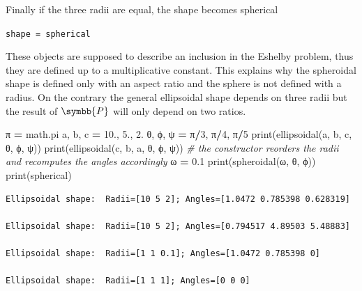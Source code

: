 \documentclass[
  a4paper,
  numbers=noendperiod,
  DIV=12]{scrreprt}
\newenvironment{Shaded}{\begin{snugshade}}{\end{snugshade}}
\newcommand{\BuiltInTok}[1]{#1}
\newcommand{\CommentTok}[1]{\textcolor[rgb]{0.56,0.35,0.01}{\textit{#1}}}
\newcommand{\DecValTok}[1]{\textcolor[rgb]{0.00,0.00,0.81}{#1}}
\newcommand{\FloatTok}[1]{\textcolor[rgb]{0.00,0.00,0.81}{#1}}
\newcommand{\NormalTok}[1]{#1}
\newcommand{\OperatorTok}[1]{\textcolor[rgb]{0.81,0.36,0.00}{\textbf{#1}}}
\newcommand{\uuuu}[1]{{\symbb{{#1}}}}
\begin{document}
Finally if the three radii are equal, the shape becomes spherical

\texttt{shape\ =\ spherical}

\begin{tcolorbox}[enhanced jigsaw, title=\textcolor{quarto-callout-warning-color}{\faExclamationTriangle}\hspace{0.5em}{Warning}, left=2mm, titlerule=0mm, colback=white, breakable, colframe=quarto-callout-warning-color-frame, bottomtitle=1mm, toptitle=1mm, rightrule=.15mm, bottomrule=.15mm, coltitle=black, opacitybacktitle=0.6, arc=.35mm, colbacktitle=quarto-callout-warning-color!10!white, leftrule=.75mm, opacityback=0, toprule=.15mm]

These objects are supposed to describe an inclusion in the Eshelby
problem, thus they are defined up to a multiplicative constant. This
explains why the spheroidal shape is defined only with an aspect ratio
and the sphere is not defined with a radius. On the contrary the general
ellipsoidal shape depends on three radii but the result of \(\uuuu{P}\)
will only depend on two ratios.

\end{tcolorbox}

\begin{Shaded}
\begin{Highlighting}[]
\NormalTok{π }\OperatorTok{=}\NormalTok{ math.pi}
\NormalTok{a, b, c }\OperatorTok{=} \FloatTok{10.}\NormalTok{, }\FloatTok{5.}\NormalTok{, }\FloatTok{2.}
\NormalTok{θ, ϕ, ψ }\OperatorTok{=}\NormalTok{ π}\OperatorTok{/}\DecValTok{3}\NormalTok{, π}\OperatorTok{/}\DecValTok{4}\NormalTok{, π}\OperatorTok{/}\DecValTok{5}
\BuiltInTok{print}\NormalTok{(ellipsoidal(a, b, c, θ, ϕ, ψ))}
\BuiltInTok{print}\NormalTok{(ellipsoidal(c, b, a, θ, ϕ, ψ)) }\CommentTok{\# the constructor reorders the radii and recomputes the angles accordingly}
\NormalTok{ω }\OperatorTok{=} \FloatTok{0.1}
\BuiltInTok{print}\NormalTok{(spheroidal(ω, θ, ϕ))}
\BuiltInTok{print}\NormalTok{(spherical)}
\end{Highlighting}
\end{Shaded}

\begin{verbatim}
Ellipsoidal shape:  Radii=[10 5 2]; Angles=[1.0472 0.785398 0.628319]

Ellipsoidal shape:  Radii=[10 5 2]; Angles=[0.794517 4.89503 5.48883]

Ellipsoidal shape:  Radii=[1 1 0.1]; Angles=[1.0472 0.785398 0]

Ellipsoidal shape:  Radii=[1 1 1]; Angles=[0 0 0]
\end{verbatim}
\end{document}

